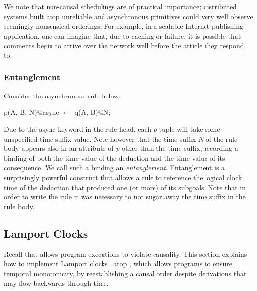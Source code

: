 We note that non-causal schedulings are of practical importance;
distributed systems built atop unreliable and asynchronous primitives
could very well observe seemingly nonsensical orderings.  For example,
in a scalable Internet publishing application, one can imagine that, due
to caching or failure, it is possible that comments begin to arrive
over the network well before the article they respond to.

\subsubsection{Entanglement}

Consider the asynchronous rule below:

\begin{Dedalus}
p(A, B, N)@async \(\leftarrow\)
  q(A, B)@N;
\end{Dedalus}

Due to the async keyword in the rule head, each \emph{p} tuple will take some unspecified time suffix value.
Note however that the time suffix $N$ of the rule body appears also in an attribute of \emph{p} other than the time suffix, recording a 
binding of both the time value of the deduction and the time value of its consequence.  We call such a binding
an \emph{entanglement}.   Entanglement is a surprisingly powerful construct that allows a rule to 
reference the logical clock time of the deduction that produced one (or more) of its subgoals.  Note that in order
to write the rule it was necessary to not sugar away the time suffix in the rule body.  


\subsection{Lamport Clocks}

Recall that \lang allows program executions to violate causality.
This section explains how to implement Lamport
clocks~\cite{timeclocks} atop \lang, which allows programs to ensure
temporal monotonicity, by reestablishing a causal order
despite derivations that may flow backwards through time.

